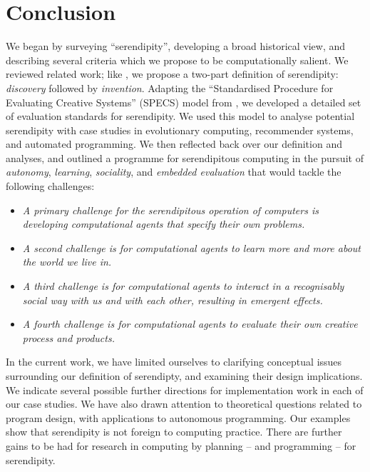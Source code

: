 \section{Conclusion} \label{sec:conclusion}

%
We began by surveying ``serendipity'', developing a broad historical
view, and describing several criteria  which we propose
to be computationally salient.  We reviewed related work; like
, we propose a two-part definition of
serendipity: \emph{discovery} followed by \emph{invention}.
%
Adapting the ``Standardised Procedure for Evaluating Creative
Systems'' (SPECS) model from , we developed a detailed set
of evaluation standards for serendipity.
%
We used this model to analyse potential serendipity with case studies in evolutionary computing, recommender systems, and automated programming.
%
We then reflected back over our definition and analyses, and outlined a programme for
serendipitous computing in the pursuit of \emph{autonomy},
\emph{learning}, \emph{sociality}, and \emph{embedded evaluation} that
would tackle the following challenges:
%
\begin{itemize}
\item \emph{A primary challenge for the serendipitous operation of
  computers is developing computational agents that specify their own
  problems.}
\item \emph{A second challenge is for computational agents to learn
  more and more about the world we live in.}
\item \emph{A third challenge is for computational agents to interact
  in a recognisably social way with us and with each other, resulting
  in emergent effects.}
\item \emph{A fourth challenge is for computational agents to evaluate
  their own creative process and products.}
\end{itemize}
%
In the current work, we have limited ourselves to clarifying
conceptual issues surrounding our definition of serendipty, and
examining their design implications.
% 
We indicate several possible further directions for implementation
work in each of our case studies.  We have also drawn attention to
theoretical questions related to program design, with applications to
autonomous programming.  Our examples show that serendipity is not
foreign to computing practice.  There are further gains to be had for
research in computing by planning -- and programming -- for
serendipity.
%

